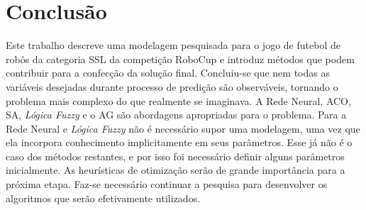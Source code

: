 \chapter{Conclusão}\label{cap:conclusao}

Este trabalho descreve uma modelagem pesquisada para o jogo de futebol de robôs da
categoria SSL da competição RoboCup e introduz métodos que podem
contribuir para a confecção da solução final. Concluiu-se que nem todas as variáveis
desejadas durante  processo de predição são observáveis, tornando o problema mais
complexo do que realmente se imaginava. A Rede Neural, ACO, SA, \textit{Lógica Fuzzy}
e o AG são abordagens apropriadas para o problema. Para a Rede Neural e \textit{Lógica Fuzzy}
não é necessário supor uma modelagem, uma vez que ela incorpora conhecimento
implicitamente em seus parâmetros. Esse já não é o caso dos métodos restantes, e por isso
foi necessário definir alguns parâmetros inicialmente. As heurísticas de otimização
serão de grande importância para a próxima etapa. Faz-se necessário continuar a
pesquisa para desenvolver os algoritmos que serão efetivamente utilizados.


